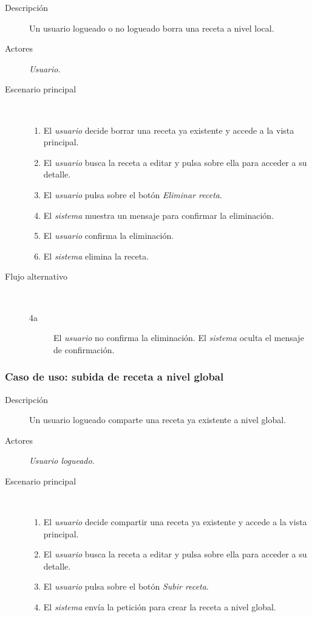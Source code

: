 \begin{description}
\item[Descripción] Un usuario logueado o no logueado borra una receta a nivel
local.
\item[Actores] \textit{Usuario}.
\item[Escenario principal] $\quad$
  \begin{enumerate}
  \item El \textit{usuario} decide borrar una receta ya existente y accede a la
  vista principal.
  \item El \textit{usuario} busca la receta a editar y pulsa sobre ella para
  acceder a su detalle.
  \item El \textit{usuario} pulsa sobre el botón \textit{Eliminar receta}.
  \item El \textit{sistema} muestra un mensaje para confirmar la eliminación.
  \item El \textit{usuario} confirma la eliminación.
  \item El \textit{sistema} elimina la receta.
  \end{enumerate}
\item[Flujo alternativo] $\quad$
  \begin{description}
  \item[4a] El \textit{usuario} no confirma la eliminación. El \textit{sistema}
  oculta el mensaje de confirmación.
  \end{description}
\end{description}



\subsubsection{Caso de uso: subida de receta a nivel global}

\begin{description}
\item[Descripción] Un usuario logueado comparte una receta ya existente a nivel
global.
\item[Actores] \textit{Usuario logueado}.
\item[Escenario principal] $\quad$
  \begin{enumerate}
  \item El \textit{usuario} decide compartir una receta ya existente y accede a
  la vista principal.
  \item El \textit{usuario} busca la receta a editar y pulsa sobre ella para
  acceder a su detalle.
  \item El \textit{usuario} pulsa sobre el botón \textit{Subir receta}.
  \item El \textit{sistema} envía la petición para crear la receta a nivel
  global.
  \end{enumerate}
\end{description}


